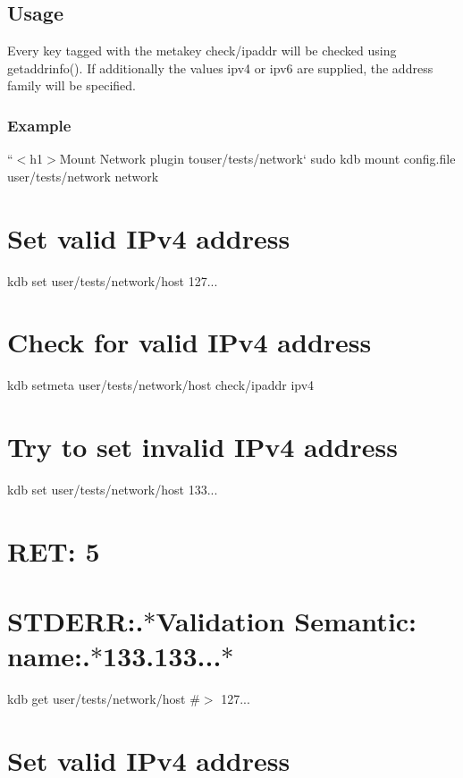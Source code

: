 \subsection*{Usage}

Every key tagged with the metakey {\ttfamily check/ipaddr} will be checked using {\ttfamily getaddrinfo()}. If additionally the values {\ttfamily ipv4} or {\ttfamily ipv6} are supplied, the address family will be specified.

\subsubsection*{Example}

``{\ttfamily  $<$h1$>$Mount Network plugin to}user/tests/network` sudo kdb mount config.\+file user/tests/network network

\section*{Set valid I\+Pv4 address}

kdb set user/tests/network/host 127... \section*{Check for valid I\+Pv4 address}

kdb setmeta user/tests/network/host check/ipaddr ipv4

\section*{Try to set invalid I\+Pv4 address}

kdb set user/tests/network/host 133... \section*{R\+ET\+: 5}

\section*{S\+T\+D\+E\+RR\+:.$\ast$\+Validation Semantic\+: name\+:.$\ast$133.133...$\ast$}

kdb get user/tests/network/host \#$>$ 127...

\section*{Set valid I\+Pv4 address}

